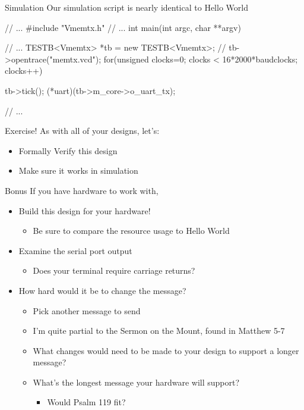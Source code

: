 \documentclass[style=gt,mode=present,paper=screen]{powerdot}
\begin{document}
%
%
\begin{slide}[bm=,toc=,method=direct]{Simulation}
Our simulation script is nearly identical to Hello World
\begin{zCpp}
// ...
#include "Vmemtx.h"
// ...
int	main(int argc, char **argv) {
	// ...
	TESTB<Vmemtx>	*tb = new TESTB<Vmemtx>;
	//
	tb->opentrace("memtx.vcd");
	for(unsigned clocks=0;
		clocks < 16*2000*baudclocks;
		 clocks++) {

		tb->tick();
		(*uart)(tb->m_core->o_uart_tx);
	} // ...
}
\end{zCpp}
\end{slide}
%
%
\begin{slide}{Exercise!}
As with all of your designs, let's:
\begin{itemize}
\item Formally Verify this design
\item Make sure it works in simulation
\end{itemize}
\end{slide}
%
%
\begin{slide}[method=direct]{Bonus}
If you have hardware to work with,
\begin{itemize}
\item Build this design for your hardware!
	\begin{itemize}
	\item Be sure to compare the resource usage to Hello World
	\end{itemize}
\item Examine the serial port output
	\begin{itemize}
	\item Does your terminal require carriage returns?
	\end{itemize}
\item How hard would it be to change the message?
	\begin{itemize}
	\item Pick another message to send
	\item I'm quite partial to the Sermon on the Mount, found in
		Matthew 5-7
	\item What changes would need to be made to your design to
		support a longer message?
	\item What's the longest message your hardware will support?
	\begin{itemize}
		\item Would Psalm 119 fit?
	\end{itemize}
	\end{itemize}
\end{itemize}
\end{slide}
\end{document}
